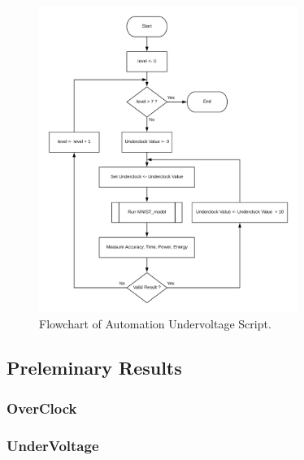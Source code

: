 \begin{figure}[!htb]
  \centering
  \includegraphics[width=0.75\textwidth]{Figures/DL/Underclock_Program.png}
  \caption[]{Flowchart of Automation Undervoltage Script.}
  \label{fig:undervoltage_program}
\end{figure}





\subsection{Preleminary Results}
\label{section:dvfseffects}

\subsubsection{OverClock}
\label{section:underclock}

\subsubsection{UnderVoltage}




